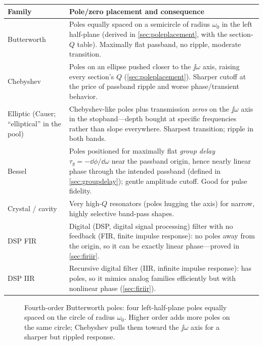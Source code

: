 \begin{tabularx}{\textwidth}{@{}L{0.19\textwidth}Y@{}}
\toprule
Family & Pole/zero placement and consequence \\
\midrule
Butterworth & Poles equally spaced on a semicircle of radius \(\omega_0\) in the left half-plane (derived in \cref{sec:poleplacement}, with the section-\(Q\) table). Maximally flat passband, no ripple, moderate transition. \\
Chebyshev & Poles on an ellipse pushed closer to the \(\jj\omega\) axis, raising every section's \(Q\) (\cref{sec:poleplacement}). Sharper cutoff at the price of passband ripple and worse phase/transient behavior. \\
Elliptic (Cauer; ``elliptical'' in the pool) & Chebyshev-like poles plus transmission \emph{zeros} on the \(\jj\omega\) axis in the stopband---depth bought at specific frequencies rather than slope everywhere. Sharpest transition; ripple in both bands. \\
Bessel & Poles positioned for maximally flat \emph{group delay} \(\tau_g=-\dd\phi/\dd\omega\) near the passband origin, hence nearly linear phase through the intended passband (defined in \cref{sec:groupdelay}); gentle amplitude cutoff. Good for pulse fidelity. \\
Crystal / cavity & Very high-\(Q\) resonators (poles hugging the axis) for narrow, highly selective band-pass shapes. \\
DSP FIR & Digital (DSP, digital signal processing) filter with no feedback (FIR, finite impulse response): no poles away from the origin, so it can be exactly linear phase---proved in \cref{sec:firiir}. \\
DSP IIR & Recursive digital filter (IIR, infinite impulse response): has poles, so it mimics analog families efficiently but with nonlinear phase (\cref{sec:firiir}). \\
\bottomrule
\end{tabularx}

\begin{figure}[htbp]
\centering
{}
\caption{Fourth-order Butterworth poles: four left-half-plane poles equally
spaced on the circle of radius \(\omega_0\). Higher order adds more poles on the
same circle; Chebyshev pulls them toward the \(\jj\omega\) axis for a sharper but
rippled response.}
\label{fig:butterworth-poles}
\end{figure}

